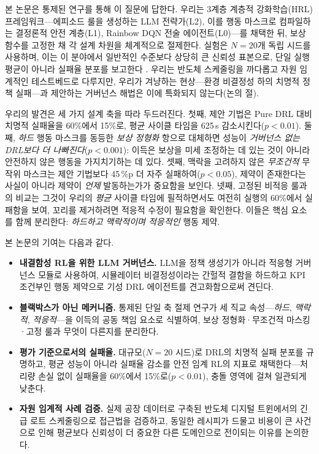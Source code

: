 \documentclass[letterpaper]{article} %
\begin{document}
본 논문은 통제된 연구를 통해 이 질문에 답한다. 우리는 3계층 계층적 강화학습(HRL)
프레임워크---에피소드 룰을 생성하는 LLM 전략가(L2), 이를 행동 마스크로 컴파일하는
결정론적 안전 계층(L1), Rainbow DQN 전술 에이전트(L0)---를 채택한 뒤, 보상 함수를
고정한 채 각 설계 차원을 체계적으로 절제한다. 실험은 $N{=}20$개 독립 시드를
사용하며, 이는 이 분야에서 일반적인 수준보다 상당히 큰 신뢰성 표본으로, 단일 실행
평균이 아니라 실패율 분포를 보고한다 \citep{henderson2018,agarwal2021}. 우리는 반도체
스케줄링을 까다롭고 자원 임계적인 테스트베드로 다루지만, 우리가 겨냥하는
현상---환경 비결정성 하의 치명적 정책 실패---과 제안하는 거버넌스 해법은 이에
특화되지 않는다(논의 절).

우리의 발견은 세 가지 설계 축을 따라 두드러진다. 첫째, 제안 기법은 Pure DRL 대비
치명적 실패율을 60\%에서 15\%로, 평균 사이클 타임을 625\,s 감소시킨다($p{<}0.01$).
둘째, \emph{하드} 행동 마스크를 동등한 \emph{보상 정형화} 항으로 대체하면 성능이
\emph{거버넌스 없는 DRL보다 더 나빠진다}($p{<}0.001$): 이득은 보상을 미세 조정하는
데 있는 것이 아니라 안전하지 않은 행동을 가지치기하는 데 있다. 셋째, 맥락을
고려하지 않은 \emph{무조건적} 무작위 마스크는 제안 기법보다 45\,\%p 더 자주
실패하여($p{<}0.05$), 제약이 존재한다는 사실이 아니라 제약이 \emph{언제} 발동하는가가
중요함을 보인다. 넷째, 고정된 비적응 룰과의 비교는 그것이 우리의 \emph{평균} 사이클
타임에 필적하면서도 여전히 실행의 60\%에서 실패함을 보여, 꼬리를 제거하려면 적응적
수정이 필요함을 확인한다. 이들은 핵심 요소를 함께 분리한다: \emph{하드하고
맥락적이며 적응적인} 행동 제약.

\noindent 본 논문의 기여는 다음과 같다.
\begin{itemize}
\setlength\itemsep{0.15em}
\item \textbf{내결함성 RL을 위한 LLM 거버넌스.} LLM을 정책 생성기가 아니라 적응형
거버넌스 모듈로 사용하여, 시뮬레이터 비결정성이라는 간헐적 결함을 하드하고 KPI 조건부인
행동 제약으로 기성 DRL 에이전트를 견고화함으로써 견딘다.
\item \textbf{블랙박스가 아닌 메커니즘.} 통제된 단일 축 절제 연구가 세 직교
속성---\emph{하드}, \emph{맥락적}, \emph{적응적}---을 이득의 공동 책임 요소로
식별하여, 보상 정형화·무조건적 마스킹·고정 룰과 무엇이 다른지를 분리한다.
\item \textbf{평가 기준으로서의 실패율.} 대규모($N{=}20$ 시드)로 DRL의 치명적 실패
분포를 규명하고, 평균 성능이 아니라 실패율 감소를 안전 임계 RL의 지표로 채택한다---처리량
손실 없이 실패율을 60\%에서 15\%로($p{<}0.01$), 충돌 영역에 걸쳐 일관되게 낮춘다.
\item \textbf{자원 임계적 사례 검증.} 실제 공장 데이터로 구축된 반도체 디지털
트윈에서의 긴급 로트 스케줄링으로 접근법을 검증하고, 동일한 레시피가 드물고 비용이 큰
사건으로 인해 평균보다 신뢰성이 더 중요한 다른 도메인으로 전이되는 이유를 논의한다.
\end{itemize}
\end{document}
